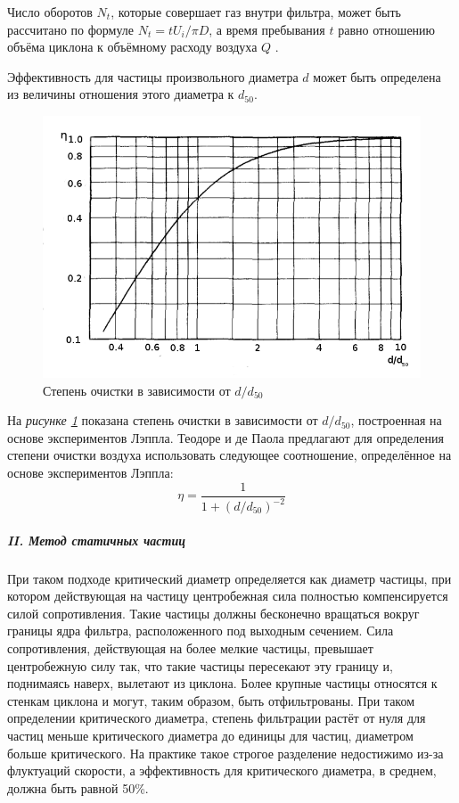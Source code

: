 	Число оборотов $N_t$, которые совершает газ внутри фильтра, может быть рассчитано по формуле $N_t = tU_i/\pi D$, а время пребывания $t$ равно отношению объёма циклона к объёмному расходу воздуха $Q$ \cite{Kuo}.
	
	Эффективность для частицы произвольного диаметра $d$ может быть определена из величины отношения этого диаметра к $d_{50}$.
	\begin{figure}[ht]
		\centering
		\includegraphics[scale=0.5]{Lapple}
		\caption{Степень очистки в зависимости от $d/d_{50}$}
		\label{fig:lapple}
	\end{figure}
	На \textit{рисунке \ref{fig:lapple}} показана степень очистки в зависимости от $d/d_{50}$, построенная на основе экспериментов Лэппла. Теодоре и де Паола \cite{Theodore} предлагают для определения степени очистки воздуха использовать следующее соотношение, определённое на основе экспериментов Лэппла:
			\begin{equation}
				\eta = \frac{1}{1 + (d/d_{50})^{-2}}
			\end{equation}
			\subparagraph{II. Метод статичных частиц\\}
			При таком подходе критический диаметр определяется как диаметр частицы, при котором действующая на частицу центробежная сила полностью компенсируется силой сопротивления. Такие частицы должны бесконечно вращаться вокруг границы ядра фильтра, расположенного под выходным сечением. Сила сопротивления, действующая на более мелкие частицы, превышает центробежную силу так, что такие частицы пересекают эту границу и, поднимаясь наверх, вылетают из циклона. Более крупные частицы относятся к стенкам циклона и могут, таким образом, быть отфильтрованы. При таком определении критического диаметра, степень фильтрации растёт от нуля для частиц меньше критического диаметра до единицы для частиц, диаметром больше критического. На практике такое строгое разделение недостижимо из-за флуктуаций скорости, а эффективность для критического диаметра, в среднем, должна быть равной 50\%.
			
